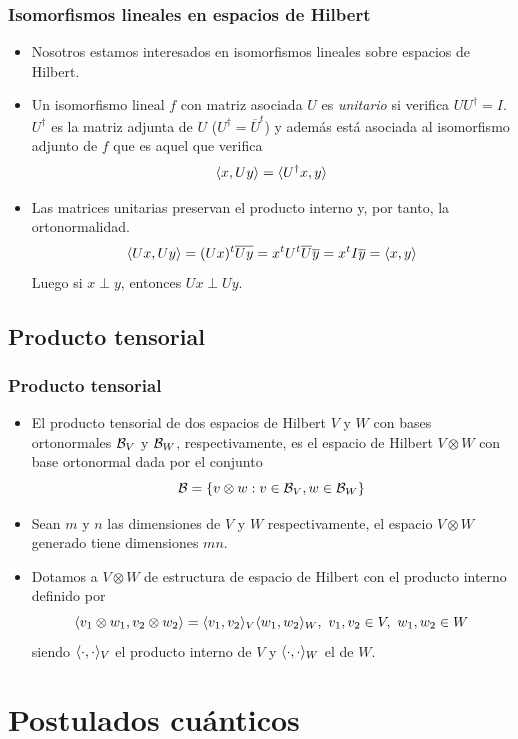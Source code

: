 \documentclass{beamer}
\begin{document}
\begin{frame}
	\frametitle{Isomorfismos lineales en espacios de Hilbert}
	\begin{itemize}
		\item Nosotros estamos interesados en isomorfismos lineales sobre espacios de Hilbert.
		\item Un isomorfismo lineal $f$ con matriz asociada $U$ es \emph{unitario} si verifica $UU^\dag=I$. $U^\dag$ es la matriz adjunta de $U$ ($U^\dag=\overline{U}^t$) y además está asociada al isomorfismo adjunto de $f$ que es aquel que verifica
		$$\langle x,Uy\rangle=\langle U^\dag x,y\rangle$$
		\item Las matrices unitarias preservan el producto interno y, por tanto, la ortonormalidad.
		$$\langle Ux,Uy\rangle=(Ux)^t\overline{Uy}=x^tU^t\overline{U}\overline{y}=x^tI\overline{y}=\langle x,y\rangle$$
		Luego si $x\perp y$, entonces $Ux\perp Uy$.
	\end{itemize}
\end{frame}



\subsection*{Producto tensorial}

\begin{frame}
	\frametitle{Producto tensorial}
	\begin{itemize}
		\item El producto tensorial de dos espacios de Hilbert $V$ y $W$ con bases ortonormales $\mathcal{B}_V$ y $\mathcal{B}_W$, respectivamente, es el espacio de Hilbert $V\otimes W$ con base ortonormal dada por el conjunto $$\mathcal{B}=\{v\otimes w:v\in\mathcal{B}_V,w\in\mathcal{B}_W\}$$
		\item Sean $m$ y $n$ las dimensiones de $V$ y $W$ respectivamente, el espacio $V\otimes W$ generado tiene dimensiones $mn$.
		\item Dotamos a $V\otimes W$ de estructura de espacio de Hilbert con el producto interno definido por
		$$\dotproduct{v_1\otimes w_1}{v_2\otimes w_2}=\dotproduct{v_1}{v_2}_V\dotproduct{w_1}{w_2}_W,\ v_1,v_2\in V,\ w_1,w_2\in W$$
		siendo $\langle\cdot,\cdot\rangle_V$ el producto interno de $V$ y $\langle\cdot,\cdot\rangle_W$ el de $W$.
	\end{itemize}
\end{frame}

\section{Postulados cuánticos}
\end{document}
